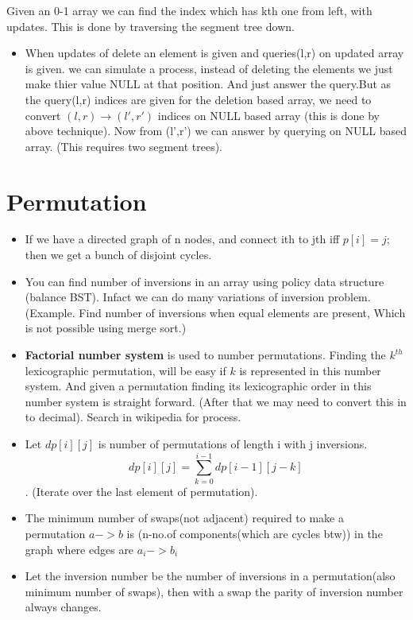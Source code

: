 \documentclass[../Notes.tex]{subfiles}
\begin{document}
Given an 0-1 array we can find the index which has kth one from left, with updates. This is done by traversing the segment tree down.\\
\begin{itemize}

\item When updates of delete an element is given and queries(l,r) on updated array is given. we can simulate a process, instead of deleting the elements we just make thier value NULL at that position. And just answer the query.But as the query(l,r) indices are given for the deletion based array, we need to convert $(l,r)\rightarrow (l',r')$ indices on NULL based array (this is done by above technique). Now from (l',r') we can answer by querying on NULL based array. (This requires two segment trees).
\end{itemize}

\section{Permutation}
\begin{itemize}
	\item If we have a directed graph of n nodes, and connect ith to jth iff $p[i]=j$; then we get a bunch of disjoint cycles.
	\item You can find number of inversions in an array using policy data structure (balance BST). Infact we can do many variations of inversion problem. (Example. Find number of inversions when equal elements are present, Which is not possible using merge sort.)
	\item \textbf{Factorial number system} is used to number permutations. Finding the $k^{th}$ lexicographic permutation, will be easy if $k$ is represented in this number system. And given a permutation finding its lexicographic order in this number system is straight forward. (After that we may need to convert this in to decimal). Search in wikipedia for process.
	\item Let $dp[i][j]$ is number of permutations of length i with j inversions. $$dp[i][j] = \sum_{k=0}^{i-1}dp[i-1][j-k]$$. (Iterate over the last element of permutation).
	\item The minimum number of swaps(not adjacent) required to make a permutation $a -> b$ is (n-no.of components(which are cycles btw)) in the graph where edges are $a_i -> b_i$
	\item Let the inversion number be the number of inversions in a permutation(also minimum number of swaps), then with a swap the parity of inversion number always changes.
\end{itemize}
\end{document}
